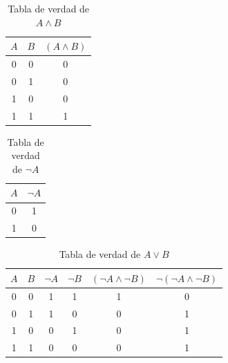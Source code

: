 \documentclass[12pt,a4paper]{book}
\begin{document}
    \begin{table}[htbp]
        \centering
        \caption{Tabla de verdad de $A \land B$}
        \renewcommand{\arraystretch}{1.5}
        \setlength{\tabcolsep}{15pt}
        \begin{tabular}{c | c | c}
            $A$ & $B$ & $(A \land B)$ \\
            \hline
            0 & 0 & 0 \\
            0 & 1 & 0 \\
            1 & 0 & 0 \\
            1 & 1 & 1 \\
        \end{tabular}
    \end{table}

    \vspace{0.5cm}

    \begin{table}[htbp]
        \centering
        \caption{Tabla de verdad de $\neg A$}
        \renewcommand{\arraystretch}{1.5}
        \setlength{\tabcolsep}{15pt}
        \begin{tabular}{c | c}
            $A$ & $\neg A$\\
            \hline
            0 & 1 \\
            1 & 0 
        \end{tabular}
    \end{table}
    
    \vspace{0.5cm}

    \begin{table}[htbp]
        \centering
        \caption{Tabla de verdad de $A\vee B$}
        \renewcommand{\arraystretch}{1.5}
        \setlength{\tabcolsep}{15pt}
        \begin{tabular}{c | c | c | c | c | c}
            $A$ & $B$ & $\neg A$ & $\neg B$ & $(\neg A\wedge\neg B)$ & $\neg(\neg A\wedge\neg B)$ \\
            \hline
            0 & 0 & 1 & 1 & 1 & 0 \\
            0 & 1 & 1 & 0 & 0 & 1 \\
            1 & 0 & 0 & 1 & 0 & 1 \\
            1 & 1 & 0 & 0 & 0 & 1
        \end{tabular}
    \end{table}

    \vspace{0.5cm}
\end{document}
